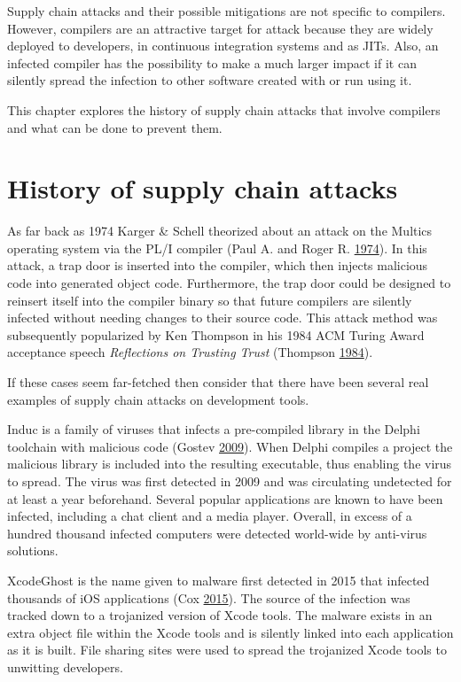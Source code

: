 \documentclass[a4paper,]{report}
\begin{document}
Supply chain attacks and their possible mitigations are not specific to
compilers. However, compilers are an attractive target for attack
because they are widely deployed to developers, in continuous
integration systems and as JITs. Also, an infected compiler has the
possibility to make a much larger impact if it can silently spread the
infection to other software created with or run using it.

This chapter explores the history of supply chain attacks that involve
compilers and what can be done to prevent them.

\hypertarget{history-of-supply-chain-attacks}{%
\section{History of supply chain
attacks}\label{history-of-supply-chain-attacks}}

As far back as 1974 Karger \& Schell theorized about an attack on the
Multics operating system via the PL/I compiler (Paul A. and Roger R.
\protect\hyperlink{ref-Karger1974}{1974}). In this attack, a trap door
is inserted into the compiler, which then injects malicious code into
generated object code. Furthermore, the trap door could be designed to
reinsert itself into the compiler binary so that future compilers are
silently infected without needing changes to their source code. This
attack method was subsequently popularized by Ken Thompson in his 1984
ACM Turing Award acceptance speech \emph{Reflections on Trusting Trust}
(Thompson \protect\hyperlink{ref-Thompson1984}{1984}).

If these cases seem far-fetched then consider that there have been
several real examples of supply chain attacks on development tools.

Induc is a family of viruses that infects a pre-compiled library in the
Delphi toolchain with malicious code (Gostev
\protect\hyperlink{ref-Gostev2009}{2009}). When Delphi compiles a
project the malicious library is included into the resulting executable,
thus enabling the virus to spread. The virus was first detected in 2009
and was circulating undetected for at least a year beforehand. Several
popular applications are known to have been infected, including a chat
client and a media player. Overall, in excess of a hundred thousand
infected computers were detected world-wide by anti-virus solutions.

XcodeGhost is the name given to malware first detected in 2015 that
infected thousands of iOS applications (Cox
\protect\hyperlink{ref-Cox2015}{2015}). The source of the infection was
tracked down to a trojanized version of Xcode tools. The malware exists
in an extra object file within the Xcode tools and is silently linked
into each application as it is built. File sharing sites were used to
spread the trojanized Xcode tools to unwitting developers.
\end{document}
